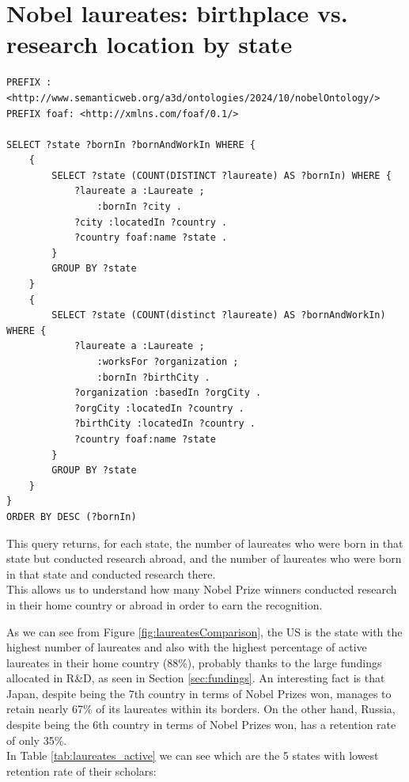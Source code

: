\documentclass{article}
\begin{document}
\newpage

\section{Nobel laureates: birthplace vs. research location by state}
\begin{lstlisting}
PREFIX : <http://www.semanticweb.org/a3d/ontologies/2024/10/nobelOntology/>
PREFIX foaf: <http://xmlns.com/foaf/0.1/>

SELECT ?state ?bornIn ?bornAndWorkIn WHERE {
    {
        SELECT ?state (COUNT(DISTINCT ?laureate) AS ?bornIn) WHERE {
            ?laureate a :Laureate ;
                :bornIn ?city .
            ?city :locatedIn ?country .
            ?country foaf:name ?state .
        }
        GROUP BY ?state
    }
    {
        SELECT ?state (COUNT(distinct ?laureate) AS ?bornAndWorkIn) WHERE {
            ?laureate a :Laureate ;
                :worksFor ?organization ;
                :bornIn ?birthCity .
            ?organization :basedIn ?orgCity .
            ?orgCity :locatedIn ?country .
            ?birthCity :locatedIn ?country .
            ?country foaf:name ?state
        }
        GROUP BY ?state
    }
}
ORDER BY DESC (?bornIn)
\end{lstlisting}

\vspace{1em}

This query returns, for each state, the number of laureates who were born in that state but conducted research abroad, and the number of
laureates who were born in that state and conducted research there.\\
This allows us to understand how many Nobel Prize winners conducted research in their home country or abroad in order to earn the recognition.

As we can see from Figure \ref{fig:laureatesComparison}, the US is the state with the highest number of laureates and also with the highest percentage
of active laureates in their home country (88\%), probably thanks to the large fundings allocated in R\&D, as seen in Section \ref{sec:fundings}. 
An interesting fact is that Japan, despite being the 7th country in terms of Nobel Prizes won, manages to retain nearly 67\% of its laureates
within its borders. On the other hand, Russia, despite being the 6th country in terms of Nobel Prizes won, has a retention rate of only 35\%.\\

In Table \ref{tab:laureates_active} we can see which are the 5 states with lowest retention rate of their scholars:
\end{document}
